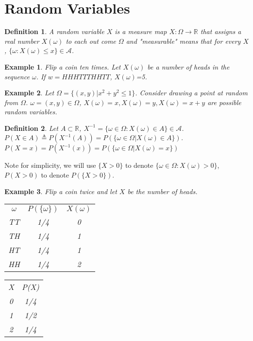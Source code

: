 \documentclass[11pt]{article}
\def\MA{{\mathcal A}}
\def\BR{{\mathbb R}}
\newtheorem{definition}{Definition}[section]
\newtheorem{example}{Example}[section]
\begin{document}
\section{Random Variables}
\begin{definition}
A random variable $X$ is a measure map $X: \Omega \to  \BR$ that assigns a real number $X(\omega)$ to each out come  $\Omega$ and "measurable" means that for every $X$, $\{\omega: X(\omega) \leq x\} \in \MA$.
\end{definition}

\begin{example}
Flip a coin ten times. Let $X(\omega)$ be a number of heads in the sequence $\omega$. If $w=HHHTTTHHTT$, $X(\omega)$=5. 
\end{example}

\begin{example}
Let $\Omega = \{(x, y) | x^2 + y^2 \leq 1\}$. Consider drawing a point at random from $\Omega$. $\omega=(x,y) \in \Omega$, $X(\omega)=x, X(\omega)=y, X(\omega)=x+y$ are possible random variables.
\end{example}

\begin{definition}
Let $A \subset \BR$, $X^{-1} = \{\omega \in \Omega: X(\omega) \in A \} \in \MA$. 
$P(X \in A) \triangleq P(X^{-1}(A)) = P(\{\omega \in \Omega | X(\omega) \in A \})$.
$P(X = x) = P(X^{-1}(x)) = P(\{\omega \in \Omega | X(\omega) = x\})$
\end{definition}

Note for simplicity, we will use $\{X>0\}$ to denote $\{\omega \in \Omega : X(\omega)>0\}$, $P(X>0)$ to denote $P(\{X>0\})$.

\begin{example}
Flip a coin twice and let $X$ be the number of heads.

\begin{tabular}{|c|c|c|}
  \hline
  $\omega$ & $P(\{\omega\})$ & $X(\omega)$ \\
  TT & 1/4 & 0 \\
  TH & 1/4 & 1 \\
  HT & 1/4 & 1 \\
  HH & 1/4 & 2 \\
  \hline
\end{tabular}

\begin{tabular}{|c|c|}
    \hline
    X & P(X) \\
    0 & 1/4 \\
    1 & 1/2 \\
    2 & 1/4 \\
    \hline
\end{tabular}
\end{example}
\end{document}
